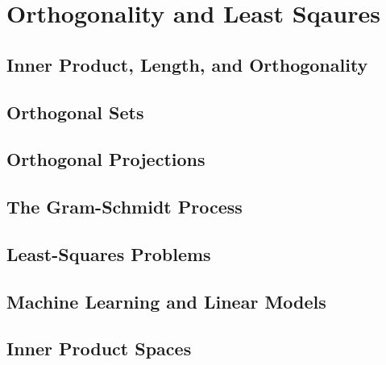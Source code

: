 \documentclass[../linalg.tex]{subfiles}
\begin{document}
\chapter{Orthogonality and Least Sqaures}
\section{Inner Product, Length, and Orthogonality}
\section{Orthogonal Sets}
\section{Orthogonal Projections}
\section{The Gram-Schmidt Process}
\section{Least-Squares Problems}
\section{Machine Learning and Linear Models}
\section{Inner Product Spaces}
\end{document}
